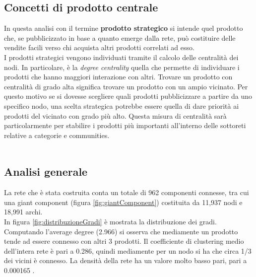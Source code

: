 \subsection{Concetti di prodotto centrale}
In questa analisi con il termine \textbf{prodotto strategico} si intende quel prodotto che, se pubblicizzato in base a quanto emerge dalla rete, può costituire delle vendite facili verso chi acquista altri prodotti correlati ad esso. \\
I prodotti strategici vengono individuati tramite il calcolo delle centralità dei nodi. In particolare, è la \textit{degree centrality} quella che permette di individuare i prodotti che hanno maggiori interazione con altri. Trovare un prodotto con centralità di grado alta significa trovare un prodotto con un ampio vicinato. Per questo motivo se si dovesse scegliere quali prodotti pubblicizzare a partire da uno specifico nodo, una scelta strategica potrebbe essere quella di dare priorità ai prodotti del vicinato con grado più alto. Questa misura di centralità sarà particolarmente per stabilire i prodotti più importanti all'interno delle sottoreti relative a categorie e communities. \\\\
    

\subsection{Analisi generale}
La rete che è stata costruita conta un totale di 962 componenti connesse, tra cui una giant component (figura \ref{fig:giantComponent}) costituita da 11,937 nodi e 18,991 archi. \\
In figura \ref{fig:distribuzioneGradi} è mostrata la distribuzione dei gradi. Computando l'average degree (2.966) si osserva che mediamente un prodotto tende ad essere connesso con altri 3 prodotti. Il coefficiente di clustering medio dell'intera rete è pari a 0.286, quindi mediamente per un nodo si ha che circa 1/3 dei vicini è connesso. La densità della rete ha un valore molto basso pari, pari a 0.000165 . \\\\

